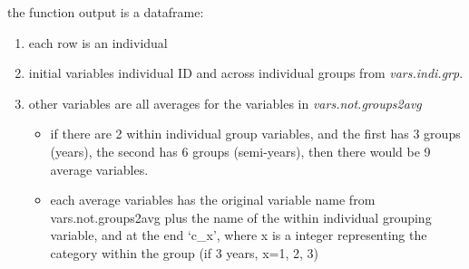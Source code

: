 \documentclass[
]{book}
\providecommand{\tightlist}{%
  \setlength{\itemsep}{0pt}\setlength{\parskip}{0pt}}
\begin{document}
the function output is a dataframe:

\begin{enumerate}
\def\labelenumi{\arabic{enumi}.}
\tightlist
\item
  each row is an individual
\item
  initial variables individual ID and across individual groups from \emph{vars.indi.grp}.
\item
  other variables are all averages for the variables in \emph{vars.not.groups2avg}

  \begin{itemize}
  \tightlist
  \item
    if there are 2 within individual group variables, and the first has 3 groups (years), the second has 6 groups (semi-years), then there would be 9 average variables.
  \item
    each average variables has the original variable name from vars.not.groups2avg plus the name of the within individual grouping variable, and at the end `c\_x', where x is a integer representing the category within the group (if 3 years, x=1, 2, 3)
  \end{itemize}
\end{enumerate}
\end{document}
